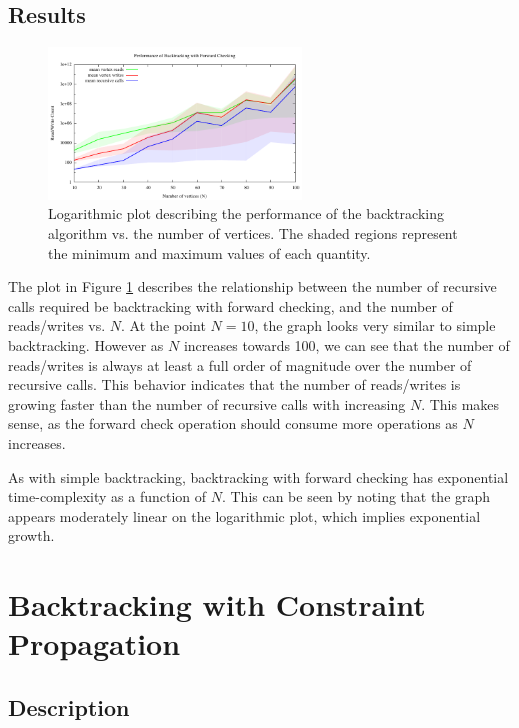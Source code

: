 \documentclass{article}
\begin{document}
	\subsection{Results}
	
		\begin{figure}[h!]
			\centering
			\includegraphics[width=0.6\textwidth]{../results_5/backtracking_forward/bt_forward_performance}
			\caption{Logarithmic plot describing the performance of the backtracking algorithm vs. the number of vertices. The shaded regions represent the minimum and maximum values of each quantity.}
			\label{forward_results}
		\end{figure}
		
		The plot in Figure \ref{forward_results} describes the relationship between the number of recursive calls required be backtracking with forward checking, and the number of reads/writes vs. $N$. At the point $N=10$, the graph looks very similar to simple backtracking. However as $N$ increases towards 100, we can see that the number of reads/writes is always at least a full order of magnitude over the number of recursive calls. This behavior indicates that the number of reads/writes is growing faster than the number of recursive calls with increasing $N$. This makes sense, as the forward check operation should consume more operations as $N$ increases.
		
		As with simple backtracking, backtracking with forward checking has exponential time-complexity as a function of $N$. This can be seen by noting that the graph appears moderately linear on the logarithmic plot, which implies exponential growth.
		
	
\section{Backtracking with Constraint Propagation}

	\subsection{Description}
	
\end{document}
